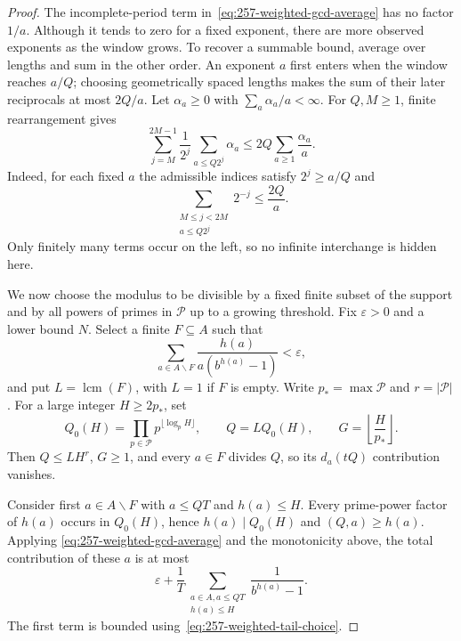 \documentclass[11pt]{article}
\theoremstyle{plain}
\theoremstyle{definition}
\theoremstyle{remark}
\begin{document}
\begin{proof}
The incomplete-period term in~\eqref{eq:257-weighted-gcd-average}
has no factor $1/a$. Although it tends to zero for a fixed exponent,
there are more observed exponents as the window grows. To recover a
summable bound, average over lengths and sum in the other order.
An exponent $a$ first enters when the window reaches $a/Q$; choosing
geometrically spaced lengths makes the sum of their later reciprocals
at most $2Q/a$. Let $\alpha_a\ge0$ with
$\sum_a\alpha_a/a<\infty$. For $Q,M\ge1$, finite rearrangement gives
\begin{equation}\label{eq:257-weighted-dyadic-average}
 \sum_{j=M}^{2M-1}\frac1{2^j}
       \sum_{a\le Q2^j}\alpha_a
 \le 2Q\sum_{a\ge1}\frac{\alpha_a}{a}.
\end{equation}
Indeed, for each fixed $a$ the admissible indices satisfy $2^j\ge a/Q$ and
\[
 \sum_{\substack{M\le j<2M\\a\le Q2^j}}2^{-j}\le\frac{2Q}{a}.
\]
Only finitely many terms occur on the left, so no infinite interchange is
hidden here.

We now choose the modulus to be divisible by a fixed finite subset
of the support and by all powers of primes in $\mathcal P$ up to a
growing threshold. Fix $\varepsilon>0$ and a lower bound $N$.  Select a finite $F\subseteq A$ such that
\begin{equation}\label{eq:257-weighted-tail-choice}
 \sum_{a\in A\mathbin{\backslash} F}
 \frac{h(a)}{a(b^{h(a)}-1)}<\varepsilon,
\end{equation}
and put $L=\operatorname{lcm}(F)$, with $L=1$ if $F$ is empty.  Write
$p_*=\max\mathcal P$ and $r=|\mathcal P|$.  For a large integer $H\ge2p_*$,
set
\[
 Q_0(H)=\prod_{p\in\mathcal P}p^{\lfloor\log_pH\rfloor},
 \qquad Q=LQ_0(H),
 \qquad G=\left\lfloor\frac H{p_*}\right\rfloor.
\]
Then $Q\le LH^r$, $G\ge1$, and every $a\in F$ divides $Q$, so its
$d_a(tQ)$ contribution vanishes.

Consider first $a\in A\mathbin{\backslash} F$ with $a\le QT$ and $h(a)\le H$.
Every prime-power factor of $h(a)$ occurs in $Q_0(H)$, hence
$h(a)\mid Q_0(H)$ and $(Q,a)\ge h(a)$.  Applying
\eqref{eq:257-weighted-gcd-average} and the monotonicity above, the total
contribution of these $a$ is at most
\begin{equation}\label{eq:257-weighted-small-part}
 \varepsilon+
 \frac1T\sum_{\substack{a\in A, a\le QT\\h(a)\le H}}
 \frac1{b^{h(a)}-1}.
\end{equation}
The first term is bounded using~\eqref{eq:257-weighted-tail-choice}.


\end{proof}
\end{document}
